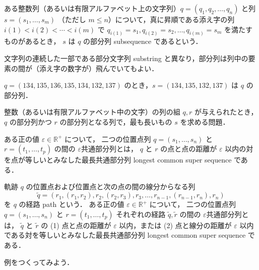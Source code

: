 \documentclass[11pt]{jarticle}
\begin{document}
\newpage

ある整数列（あるいは有限アルファベット上の文字列）$q = (q_1, q_2, \ldots, q_n)$ と列 $s = (s_1, \ldots, s_m)$ （ただし $m \leq n$）について，真に昇順である添え字の列 $i(1) < i(2) < \cdots < i(m)$ で $q_{i(1)} = s_1, q_{i(2)} = s_2, \ldots, q_{i(m)} = s_m$ を満たすものがあるとき，
$s$ は $q$ の部分列 subsequence であるという．

文字列の連続した一部である部分文字列 substring と異なり，部分列は列中の要素の間が（添え字の数字が）飛んでいてもよい．

\begin{example}
$q = (134, 135, 136, 135, 134, 132, 137)$ のとき，$s = (134, 135, 132, 137)$ は $q$ の部分列．
\end{example}

\begin{defn}
整数（あるいは有限アルファベット中の文字）の列の組 $q, r$ が与えられたとき，
$q$ の部分列かつ $r$ の部分列となる列で，最も長いもの $s$ を求める問題．
\end{defn}

\begin{defn}[2つの位置点列の最長共通部分列 (I)]
ある正の値 $\varepsilon \in \mathbb{R}^+$ について，
二つの位置点列 $q = (s_1, \ldots, s_n)$ と $r = (t_1, \ldots, t_p)$ の間の $\varepsilon$共通部分列とは，
 $q$ と $r$ の点と点の距離が $\varepsilon$ 以内の対を点が等しいとみなした最長共通部分列 longest common super sequence である．
\end{defn}

\begin{defn}[2つの位置点列の最長共通部分列 (II)]
軌跡 $q$ の位置点および位置点と次の点の間の線分からなる列
\[
\tilde{q} = (r_1, (r_1, r_2), r_2, (r_2, r_3), r_3, \ldots, r_{n-1}, (r_{n-1}, r_n), r_n)
\]
を $q$ の経路 path という．
ある正の値 $\varepsilon \in \mathbb{R}^+$ について，
二つの位置点列 $q = (s_1, \ldots, s_n)$ と $r = (t_1, \ldots, t_p)$ それぞれの経路 $\tilde{q}, \tilde{r}$ の間の $\varepsilon$共通部分列とは，
 $\tilde{q}$ と $\tilde{r}$ の (1) 点と点の距離が $\varepsilon$ 以内，または (2) 点と線分の距離が $\varepsilon$ 以内である対を等しいとみなした最長共通部分列 longest common super sequence である．
\end{defn}

\begin{example}
例をつくってみよう．
\end{example}
\end{document}
